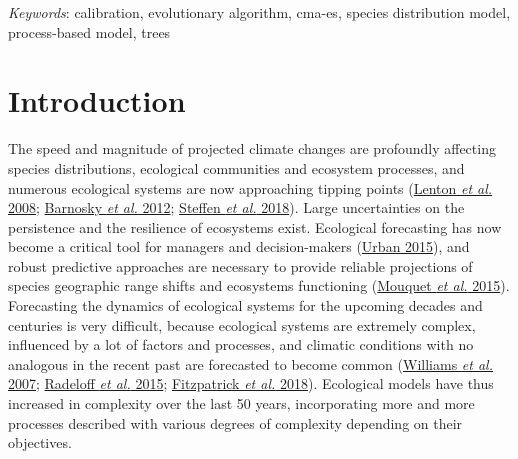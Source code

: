 \documentclass[11pt,]{article}
\renewenvironment{abstract}
 {{%
    \setlength{\leftmargin}{0mm}
    \setlength{\rightmargin}{\leftmargin}%
  }%
  \relax}
 {\endlist}
\begin{document}
\begin{abstract}
\vskip 8.5pt \noindent \emph{Keywords}: calibration, evolutionary
algorithm, cma-es, species distribution model, process-based model,
trees \par

    \hbox{\vrule height .2pt width 39.14pc}



\end{abstract}


\vskip -8.5pt



\noindent \doublespacing

\hypertarget{introduction}{%
\section{Introduction}\label{introduction}}

The speed and magnitude of projected climate changes are profoundly
affecting species distributions, ecological communities and ecosystem
processes, and numerous ecological systems are now approaching tipping
points (\protect\hyperlink{ref-Lenton2008}{Lenton \emph{et al.} 2008};
\protect\hyperlink{ref-Barnosky2012}{Barnosky \emph{et al.} 2012};
\protect\hyperlink{ref-Steffen2018}{Steffen \emph{et al.} 2018}). Large
uncertainties on the persistence and the resilience of ecosystems exist.
Ecological forecasting has now become a critical tool for managers and
decision-makers (\protect\hyperlink{ref-Urban2015}{Urban 2015}), and
robust predictive approaches are necessary to provide reliable
projections of species geographic range shifts and ecosystems
functioning (\protect\hyperlink{ref-Mouquet2015}{Mouquet \emph{et al.}
2015}). Forecasting the dynamics of ecological systems for the upcoming
decades and centuries is very difficult, because ecological systems are
extremely complex, influenced by a lot of factors and processes, and
climatic conditions with no analogous in the recent past are forecasted
to become common (\protect\hyperlink{ref-Williams2007}{Williams \emph{et
al.} 2007}; \protect\hyperlink{ref-Radeloff2015}{Radeloff \emph{et al.}
2015}; \protect\hyperlink{ref-Fitzpatrick2018}{Fitzpatrick \emph{et al.}
2018}). Ecological models have thus increased in complexity over the
last 50 years, incorporating more and more processes described with
various degrees of complexity depending on their objectives.
\end{document}
